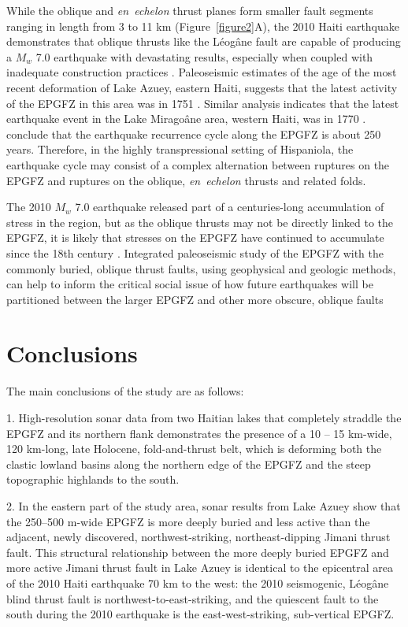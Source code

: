 \documentclass[linenumbers,draft]{agujournal}
\begin{document}
While the oblique and \textit{en~echelon} thrust planes form smaller fault segments ranging in length from 3 to 11 km (Figure~\ref{figure2}A), the 2010 Haiti earthquake demonstrates that oblique thrusts like the L\'eog\^ane fault are capable of producing a $M_w$ 7.0 earthquake with devastating results, especially when coupled with inadequate construction practices \citep{symithe2016present}. Paleoseismic estimates of the age of the most recent deformation of Lake Azuey, eastern Haiti, suggests that the latest activity of the EPGFZ in this area was in 1751 \citep{prentice2010seismic,bakun2012significant}. Similar analysis indicates that the latest earthquake event in the Lake Mirago\^ane area, western Haiti, was in 1770 \citep{bakun2012significant}. \citet{bakun2012significant} conclude that the earthquake recurrence cycle along the EPGFZ is about 250 years. Therefore, in the highly transpressional setting of Hispaniola, the earthquake cycle may consist of a complex alternation between ruptures on the EPGFZ and ruptures on the oblique, \textit{en~echelon} thrusts and related folds. 

The 2010 $M_w$ 7.0 earthquake released part of a centuries-long accumulation of stress in the region, but as the oblique thrusts may not be directly linked to the EPGFZ, it is likely that stresses on the EPGFZ have continued to accumulate since the 18th century \citep{prentice2010seismic}. Integrated paleoseismic study of the EPGFZ with the commonly buried, oblique thrust faults, using geophysical and geologic methods, can help to inform the critical social issue of how future earthquakes will be partitioned between the larger EPGFZ and other more obscure, oblique faults

\section{Conclusions}
The main conclusions of the study are as follows: 

1. High-resolution sonar data from two Haitian lakes that completely straddle the EPGFZ and its northern flank demonstrates the presence of a 10 -- 15 km-wide, 120 km-long, late Holocene, fold-and-thrust belt, which is deforming both the clastic lowland basins along the northern edge of the EPGFZ and the steep topographic highlands to the south. 

2. In the eastern part of the study area, sonar results from Lake Azuey show that the 250--500 m-wide EPGFZ is more deeply buried and less active than the adjacent, newly discovered, northwest-striking, northeast-dipping Jimani thrust fault. This structural relationship between the more deeply buried EPGFZ and more active Jimani thrust fault in Lake Azuey is identical to the epicentral area of the 2010 Haiti earthquake 70 km to the west: the 2010 seismogenic, L\'eog\^ane blind thrust fault is northwest-to-east-striking, and the quiescent fault to the south during the 2010 earthquake is the east-west-striking, sub-vertical EPGFZ. 
\end{document}
